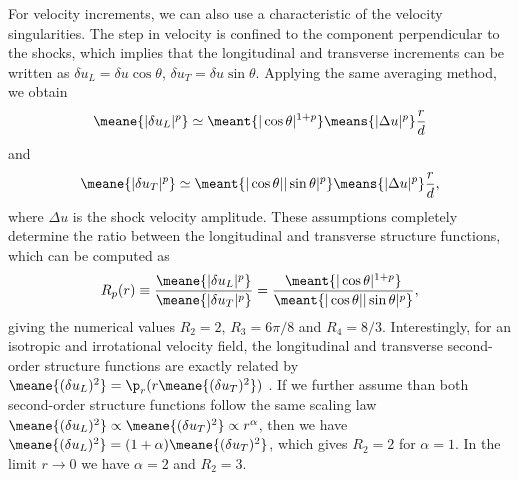 For velocity increments, we can also use a characteristic of the
velocity singularities.  The step in velocity is confined to  the component
perpendicular to the shocks, which implies that the longitudinal and
transverse increments can be written as  $\delta u_L = \delta u
\cos\theta$, $\delta u_T = \delta u \sin\theta$.
%
Applying the same averaging method, we obtain
\begin{equation} \label{StepL}
\meane{|\delta u_L|^p}
\simeq
\meant{|\cos\theta|^{1+p}}
\means{|\Delta u |^p} \frac{r}{d}
\end{equation}
and
\begin{equation} \label{StepT}
\meane{|\delta u_T|^p}
\simeq
\meant{|\cos\theta||\sin\theta|^{p}}
\means{|\Delta u |^p} \frac{r}{d},
\end{equation}
where $\Delta u $ is the shock velocity amplitude.
%
These assumptions completely determine the ratio between the
longitudinal and transverse structure functions, which can be computed as
\begin{eqnarray} \label{Ratio}
R_p(r) \equiv \frac{\meane{|\delta u_L|^p}}{\meane{|\delta u_T|^p}} =
\frac{\meant{|\cos\theta|^{1+p}}}{\meant{|\cos\theta||\sin\theta|^p}},
\end{eqnarray}
giving the numerical values $R_2 = 2$, $R_3 = 6\pi/8$ and $R_4 = 8/3$.
Interestingly, for an isotropic and irrotational velocity field, the longitudinal and transverse second-order structure functions
are exactly related by $\meane{(\delta u_L)^2} = \p_r( r\meane{(\delta
u_T)^2} )$ \citep[]{Lindborg2007jas}. If we further assume than both second-order structure functions follow
the same scaling law $\meane{ (\delta u_L)^2} \propto \meane{ (\delta
u_T)^2} \propto r^\alpha$, then we have $\meane{ (\delta u_L)^2} =
(1+\alpha) \meane{ (\delta u_T)^2} $, which gives $ R_2 = 2 $ for
$  \alpha = 1$.  In the limit $ r \rightarrow 0 $ we have $ \alpha = 2 $ and $ R_2 = 3 $.
%

